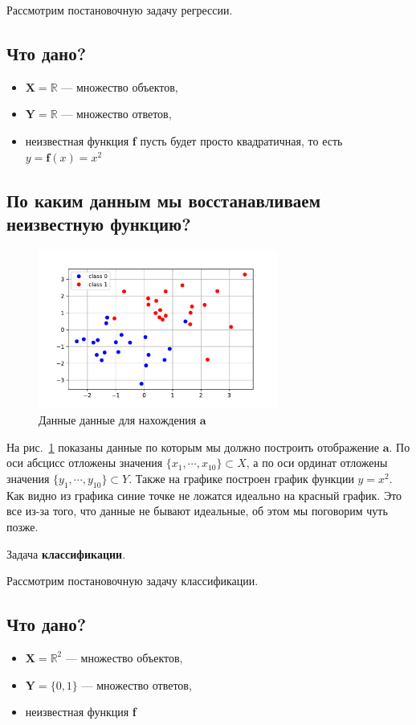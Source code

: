 Рассмотрим постановочную задачу регрессии.
\subsection{Что дано?}
\begin{itemize}
	\item $\textbf{X} = \mathbb{R}$ --- множество объектов,
	\item $\textbf{Y} = \mathbb{R}$ --- множество ответов,
	\item неизвестная функция \textbf{f} пусть будет просто квадратичная, то есть $y = \textbf{f}(x) = x^2$ 
\end{itemize}

\subsection{По каким данным мы восстанавливаем неизвестную функцию?}
\begin{figure}[h!t]\center
\includegraphics[width=0.7\textwidth]{section/section2_1.pdf}
\caption{Данные данные для нахождения $\textbf{a}$}
\label{Lecture_2_regress}
\end{figure}

На рис.~\ref{Lecture_2_regress} показаны данные по которым мы должно построить отображение $\textbf{a}$. По оси абсцисс отложены значения $\{x_1, \cdots, x_{10}\} \subset X$, а по оси ординат отложены значения $\{y_1, \cdots, y_{10}\} \subset Y$. Также на графике построен график функции $y = x^2$. Как видно из графика синие точке не ложатся идеально на красный график. Это все из-за того, что данные не бывают идеальные, об этом мы поговорим чуть позже.

  \begin{center}
Задача {\bf классификации}.
 \end{center}
 
 Рассмотрим постановочную задачу классификации.
\subsection{Что дано?}
\begin{itemize}
	\item $\textbf{X} = \mathbb{R}^2$ --- множество объектов,
	\item $\textbf{Y} = \{0,1\}$ --- множество ответов,
	\item неизвестная функция \textbf{f} 
\end{itemize}


